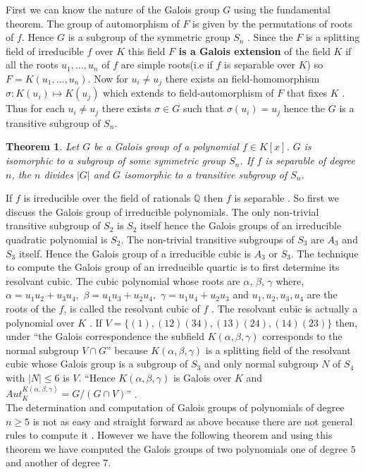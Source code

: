 \documentclass[a4paper,twoside,10pt]{article}
\theoremstyle{plain}
\newtheorem{theorem}{Theorem}[section]
\theoremstyle{definition}
\begin{document}
\noindent
First we can know the nature of the Galois group \(G\) using the fundamental theorem. The group of automorphism of \(F\) is given by the permutations of roots of \(f\). Hence \(G\) is a subgroup of the symmetric group \(S_n\) \cite{hunger}. Since the  \(F\) is a splitting field of irreducible \(f\) over \(K\) this field \textbf{\(F\) is a Galois extension} of the field \(K\) \cite{hunger} if all the roots \(u_1,...,u_n\) of \(f\) are simple roots(i.e if \(f\) is separable over \(K\)) so \(F=K(u_1,...,u_n)\). Now for \(u_i \neq u_j\) there exists an field-homomorphism \( \sigma : K(u_i) \mapsto K(u_j) \) which extends to field-automorphism of \(F\) that fixes \(K\) \cite{hunger}. Thus for each \(u_i \neq u_j\) there exists \(\sigma \in G\) such that \(\sigma(u_i) = u_j\) hence the \(G\) is a transitive subgroup of \(S_n\).

\begin{theorem} \cite{hunger}
  Let \(G\) be a Galois group of a polynomial \(f \in K[x]\). \(G\) is isomorphic to a subgroup of some symmetric group \(S_n\). If \(f\) is separable of degree \(n\), the \(n\) divides \(|G|\) and \(G\) isomorphic to a transitive subgroup of \(S_n\).
\end{theorem}

\noindent
If \(f\) is irreducible over the field of rationals \(\mathbb{Q}\) then \(f\) is separable \cite{hunger}. So first we discuss the Galois group of irreducible polynomials. The only non-trivial transitive subgroup of \(S_2\) is \(S_2\) itself hence the Galois groups of an irreducible quadratic polynomial is \(S_2\). The non-trivial transitive subgroups of \(S_3\) are \(A_3\) and \(S_3\) itself. Hence the Galois group of a irreducible cubic is \(A_3\) or \(S_3\). The technique to compute the Galois group of an irreducible quartic is to first determine its resolvant cubic. The cubic polynomial whose roots are \(\alpha\), \(\beta\), \(\gamma\) where, \(\alpha=u_1u_2+u_3u_4,\) \(\beta=u_1u_3+u_2u_4,\) \(\gamma=u_1u_4+u_2u_3\) and  \(u_1, u_2, u_3, u_4\) are the roots of the \(f\), is called the resolvant cubic of \(f\) \cite{hunger}. The resolvant cubic is actually a polynomial over \(K\) \cite{hunger}. If \(V=\{(1),(12)(34),(13)(24),(14)(23)\}\) then, under ``the Galois correspondence the subfield \(K(\alpha, \beta, \gamma)\) corresponds to the normal subgroup \(V \cap G\)'' \cite{hunger} because \(K(\alpha,\beta,\gamma)\) is a splitting field of the resolvant cubic whose Galois group is a subgroup of \(S_3\) and only normal subgroup \(N\) of \(S_4\) with \(|N| \leq 6\) is \(V\). ``Hence \(K(\alpha, \beta, \gamma)\) is Galois over \(K\) and \(Aut_K^{K(\alpha, \beta, \gamma)} = G/(G \cap V)\)'' \cite{hunger}.\\[3mm]
\noindent
The determination and computation of Galois groups of polynomials of degree \(n \geq 5\) is not as easy and straight forward as above because there are not general rules to compute it \cite{hunger}. However we have the following theorem and using this theorem we have computed the Galois groups of two polynomials one of degree \(5\) and another of degree \(7\).
\end{document}
